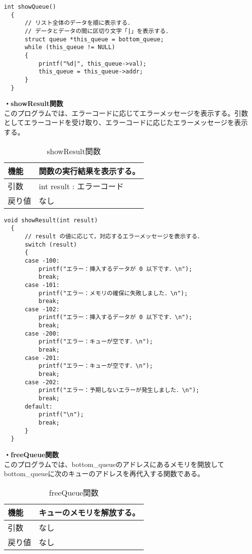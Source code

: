 \documentclass[dvipdfmx]{jsarticle}
\begin{document}
\begin{lstlisting}[caption={showQueue関数}, label={lst:showQueue_func_3}]
  int showQueue()
  {
      // リスト全体のデータを順に表示する．
      // データとデータの間に区切り文字「|」を表示する．
      struct queue *this_queue = bottom_queue;
      while (this_queue != NULL)
      {
          printf("%d|", this_queue->val);
          this_queue = this_queue->addr;
      }
  }
\end{lstlisting}  
\textbf{・showResult関数}\\
このプログラムでは、エラーコードに応じてエラーメッセージを表示する。引数としてエラーコードを受け取り、エラーコードに応じたエラーメッセージを表示する。
\begin{table}[ht]
  \centering
  \caption{showResult関数}
  \begin{tabular}{|p{5cm}|p{10cm}|}
    \hline
    機能  & 関数の実行結果を表示する。                                      \\
    \hline
    引数  & int result : エラーコード \\
    \hline
    戻り値 & なし \\
    \hline
  \end{tabular}
  \label{tab:showResult_func_3}
\end{table}
\begin{lstlisting}[caption={showResult関数}, label={lst:showResult_func_3}]
  void showResult(int result)
  {
      // result の値に応じて，対応するエラーメッセージを表示する．
      switch (result)
      {
      case -100:
          printf("エラー：挿入するデータが 0 以下です．\n");
          break;
      case -101:
          printf("エラー：メモリの確保に失敗しました．\n");
          break;
      case -102:
          printf("エラー：挿入するデータが 0 以下です．\n");
          break;
      case -200:
          printf("エラー：キューが空です．\n");
          break;
      case -201:
          printf("エラー：キューが空です．\n");
          break;
      case -202:
          printf("エラー：予期しないエラーが発生しました．\n");
          break;
      default:
          printf("\n");
          break;
      }
  }
\end{lstlisting}  
\newpage
\textbf{・freeQueue関数}\\
このプログラムでは、bottom\_queueのアドレスにあるメモリを開放してbottom\_queueに次のキューのアドレスを再代入する関数である。
\begin{table}[ht]
  \centering
  \caption{freeQueue関数}
  \begin{tabular}{|p{5cm}|p{10cm}|}
    \hline
    機能  & キューのメモリを解放する。                                      \\
    \hline
    引数  & なし \\
    \hline
    戻り値 & なし \\
    \hline
  \end{tabular}
  \label{tab:freeQueue_func}
\end{table}
\end{document}
